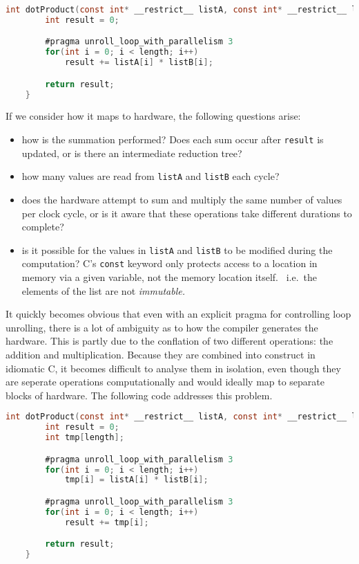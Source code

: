 \documentclass[english,onecolumn]{scrartcl}
\begin{document}
\begin{lstlisting}[language=C]
    int dotProduct(const int* __restrict__ listA, const int* __restrict__ listB, int length){
        int result = 0;

        #pragma unroll_loop_with_parallelism 3
        for(int i = 0; i < length; i++)
            result += listA[i] * listB[i];

        return result;
    }
\end{lstlisting}

If we consider how it maps to hardware, the following questions arise:
\begin{itemize}
    \item how is the summation performed? Does each sum occur after \texttt{result} is updated, or is there an intermediate
            reduction tree?
    \item how many values are read from \texttt{listA} and \texttt{listB} each cycle?
    \item does the hardware attempt to sum and multiply the same number of values per clock cycle, or is it aware that these
            operations take different durations to complete?
    \item is it possible for the values in \texttt{listA} and \texttt{listB} to be modified during the computation? C's
        \texttt{const} keyword only protects access to a location in memory via a given variable, not the memory location itself.
        \ i.e.\ the elements of the list are not \textit{immutable.}
\end{itemize}

It quickly becomes obvious that even with an explicit pragma for controlling loop unrolling, there is a lot of ambiguity as to how
the compiler generates the hardware. This is partly due to the conflation of two different operations: the addition and
multiplication. Because they are combined into construct in idiomatic C, it becomes difficult to analyse them in isolation, even
though they are seperate operations computationally and would ideally map to separate blocks of hardware. The following code
addresses this problem.

\begin{lstlisting}[language=C]
    int dotProduct(const int* __restrict__ listA, const int* __restrict__ listB, int length){
        int result = 0;
        int tmp[length];

        #pragma unroll_loop_with_parallelism 3
        for(int i = 0; i < length; i++)
            tmp[i] = listA[i] * listB[i];

        #pragma unroll_loop_with_parallelism 3
        for(int i = 0; i < length; i++)
            result += tmp[i];

        return result;
    }
\end{lstlisting}
\end{document}
